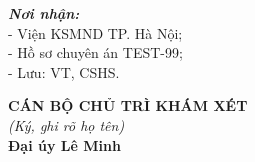 \documentclass[12pt,a4paper]{article}
\begin{document}
\noindent
\begin{minipage}[t]{0.45\textwidth}
    \small
    \textbf{\textit{Nơi nhận:}}\\
    - Viện KSMND TP. Hà Nội;\\
    - Hồ sơ chuyên án TEST-99;\\
    - Lưu: VT, CSHS.
\end{minipage}
\hfill
\begin{minipage}[t]{0.5\textwidth}
    \begin{center}
        \small
        \textbf{CÁN BỘ CHỦ TRÌ KHÁM XÉT}\\
        \textit{(Ký, ghi rõ họ tên)}\\[1.5cm]
        \textbf{Đại úy Lê Minh}
    \end{center}
\end{minipage}
\end{document}
